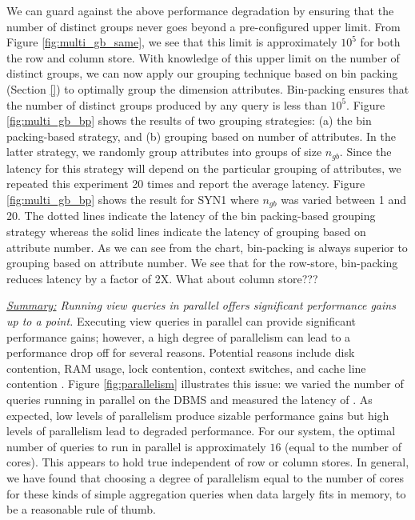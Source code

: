 We can guard against the above performance degradation by ensuring that the
number of distinct groups never goes beyond a pre-configured upper limit.
From Figure \ref{fig:multi_gb_same}, we see that this limit is approximately
$10^5$ for both the row and column store.
With knowledge of this upper limit on the number of distinct groups, we can now
apply our grouping technique based on bin packing (Section \ref{}) to optimally
group the dimension attributes.
Bin-packing ensures that the number of distinct groups produced by any query is
less than $10^5$.
Figure \ref{fig:multi_gb_bp} shows the results of two grouping strategies: (a)
the bin packing-based strategy, and (b) grouping based on number of attributes.
In the latter strategy, we randomly group attributes into groups of size
$n_{gb}$. 
Since the latency for this strategy will depend on the particular grouping of
attributes, we repeated this experiment 20 times and report the average latency.
Figure \ref{fig:multi_gb_bp} shows the result for SYN1 where $n_{gb}$ was varied
between 1 and 20.
The dotted lines indicate the latency of the bin packing-based grouping strategy
whereas the solid lines indicate the latency of grouping based on attribute
number.
As we can see from the chart, bin-packing is always superior to grouping
based on attribute number.
We see that for the row-store, bin-packing reduces latency by a factor of 2X. 
What about column store???\\



{\em \underline{Summary:} Running view queries in parallel offers significant
performance gains up to a point.}
Executing view queries in parallel can provide significant performance gains;
however, a high degree of parallelism can lead to a performance drop off for
several reasons. Potential reasons include disk contention, RAM usage, lock
contention, context switches, and cache line contention \cite{Postgres_wiki}. 
Figure \ref{fig:parallelism} illustrates this issue: we varied the number of
queries running in parallel on the DBMS and measured the latency of
\VizRecDB.
As expected, low levels of parallelism produce sizable performance gains but
high levels of parallelism lead to degraded performance.
For our system, the optimal number of queries to run in parallel is
approximately $16$ (equal to the number of cores). 
This appears to hold true independent of row or column stores. 
In general, we have found that choosing a degree of parallelism equal to the number of cores
for these kinds of simple aggregation queries when data largely fits in memory,
to be a reasonable rule of thumb.  


